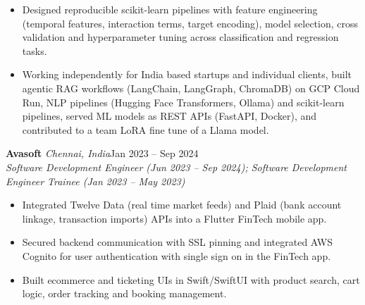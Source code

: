\documentclass[a4paper,11pt]{article}
\newcommand{\role}[4]{%
  \textbf{#1}{\color{muted}\,\textperiodcentered\,\textit{#2}}\hfill{\color{muted}#3}\\
  \textit{#4}\par}
\newcommand{\gap}{\vspace{5pt}}
\begin{document}
\begin{itemize}
  \item Designed reproducible scikit-learn pipelines with feature engineering (temporal features, interaction terms, target encoding), model selection, cross validation and hyperparameter tuning across classification and regression tasks.
  \item Working independently for India based startups and individual clients, built agentic RAG workflows (LangChain, LangGraph, ChromaDB) on GCP Cloud Run, NLP pipelines (Hugging Face Transformers, Ollama) and scikit-learn pipelines, served ML models as REST APIs (FastAPI, Docker), and contributed to a team LoRA fine tune of a Llama model.
\end{itemize}
\gap
{}
\role{Avasoft}{Chennai, India}{Jan 2023 – Sep 2024}{Software Development Engineer (Jun 2023 – Sep 2024); Software Development Engineer Trainee (Jan 2023 – May 2023)}
\begin{itemize}
  \item Integrated Twelve Data (real time market feeds) and Plaid (bank account linkage, transaction imports) APIs into a Flutter FinTech mobile app.
  \item Secured backend communication with SSL pinning and integrated AWS Cognito for user authentication with single sign on in the FinTech app.
  \item Built ecommerce and ticketing UIs in Swift/SwiftUI with product search, cart logic, order tracking and booking management.
\end{itemize}
\end{document}
